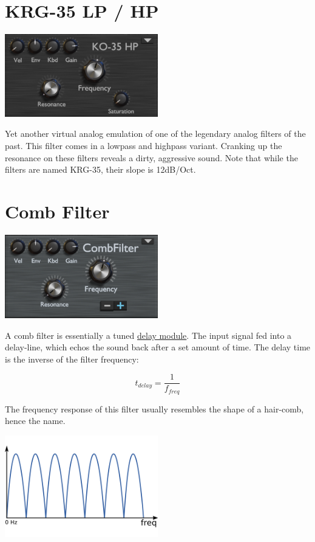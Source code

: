 \section{KRG-35 LP / HP}
\begin{center}
    \includegraphics[width=0.5\textwidth]{graphics/korg_filter.png}
\end{center}

Yet another virtual analog emulation of one of the legendary analog filters of the past. This filter comes in a lowpass and highpass variant. Cranking up the resonance on these filters reveals a dirty, aggressive sound. Note that while the filters are named KRG-35, their slope is 12dB/Oct.

\section{Comb Filter}
\label{comb_filter}
\begin{center}
    \includegraphics[width=0.5\textwidth]{graphics/comb_filter.png}
\end{center}

A comb filter is essentially a tuned \hyperref[delay]{delay module}. The input signal fed into a delay-line, which echos the sound back after a set amount of time. The delay time is the inverse of the filter frequency:

\begin{equation}
    t_{delay} = \frac{1}{f_{freq}}
\end{equation}

The frequency response of this filter usually resembles the shape of a hair-comb, hence the name.
\begin{center}
    \includegraphics[width=0.5\textwidth]{graphics/comb_response.png}
\end{center}

